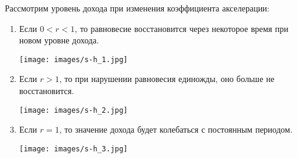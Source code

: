 Рассмотрим уровень дохода при изменения коэффициента акселерации:
\begin{enumerate}


\item Если $0<r<1$, то равновесие восстановится через некоторое время при новом уровне дохода.\\
    \begin{center}
      \texttt{[image: images/s-h\_1.jpg]}
    \end{center}
\item Если $r>1$, то при нарушении равновесия единожды, оно больше не восстановится.\\
  \begin{center}
    \texttt{[image: images/s-h\_2.jpg]}
  \end{center}
\item Если $r=1$, то значение дохода будет колебаться с постоянным периодом.\\
  \begin{center}
    \texttt{[image: images/s-h\_3.jpg]}
  \end{center}
\end{enumerate}
